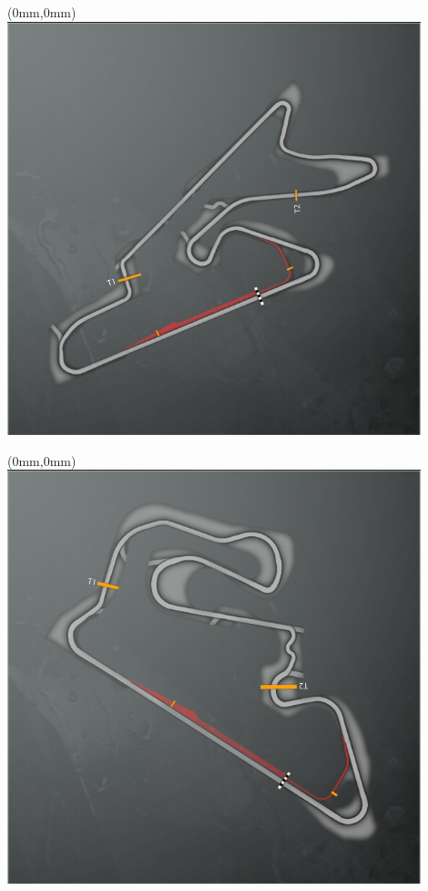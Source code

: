 \null\newpage
\begin{textblock*}{30mm}(0mm,0mm)%
\includegraphics[width=120mm]{TR/2015-05-20_00026.png}
\end{textblock*}
\null\newpage
\begin{textblock*}{30mm}(0mm,0mm)%
\includegraphics[width=120mm]{TR/2015-05-20_00025.png}
\end{textblock*}
